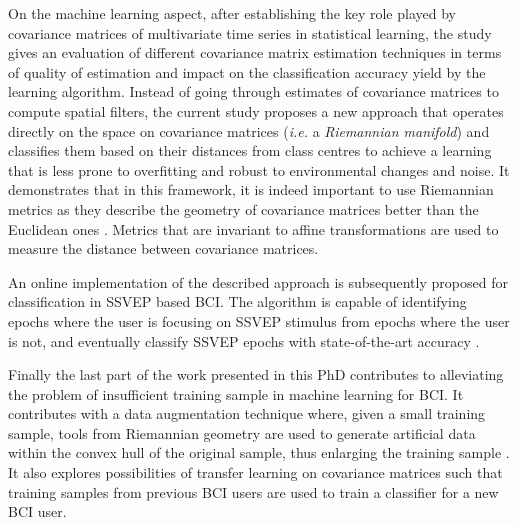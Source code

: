 On the machine learning aspect,
after establishing the key role played by covariance matrices of multivariate time series in statistical learning, the study gives an evaluation of different covariance matrix estimation techniques in terms of quality of estimation and impact on the classification accuracy yield by the learning algorithm.  
Instead of going through estimates of covariance matrices to compute spatial filters, the current study proposes a new approach that operates directly on the space on covariance matrices (\textit{i.e.} a \emph{Riemannian manifold}) and classifies them based on their distances from class centres to achieve a learning that is less prone to overfitting and robust to environmental changes and noise. 
It demonstrates that in this framework, it is indeed important to use Riemannian metrics as they describe the geometry of covariance matrices better than the Euclidean ones \citep{kalunga_euclidean_2015}. 
Metrics that are invariant to affine transformations are used to measure the distance between covariance matrices. 

An online implementation of the described approach is subsequently proposed for classification in SSVEP based BCI. 
The algorithm is capable of identifying epochs where the user is focusing on SSVEP stimulus from epochs where the user is not, and eventually classify SSVEP epochs with state-of-the-art accuracy \citep{kalunga_online_2016}. 

Finally the last part of the work presented in this PhD contributes to alleviating the problem of insufficient training sample in machine learning for BCI. 
It contributes with a data augmentation technique where, given a small training sample, tools from Riemannian geometry are used to generate artificial data within the convex hull of the original sample, thus enlarging the training sample \citep{kalunga_data_2015}. 
It also explores possibilities of transfer learning on covariance matrices such that training samples from previous BCI users are used to train a classifier for a new BCI user.  



